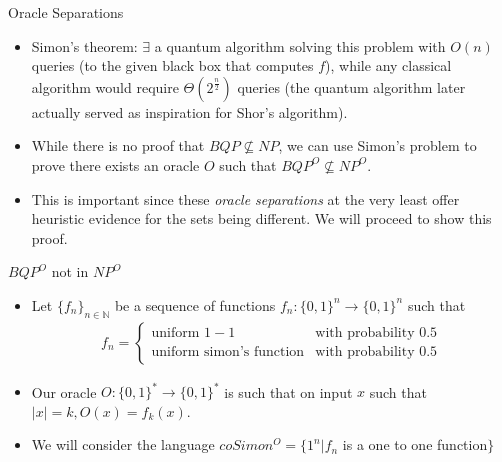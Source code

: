 \documentclass[aspectratio=169]{beamer}
\begin{document}
\begin{frame}{Oracle Separations}
  \begin{itemize}
    \item Simon's theorem: $\exists$ a quantum algorithm solving this problem with $O(n)$ queries (to the given black box that computes $f$), while any classical algorithm would require $\Theta(2^{\frac{n}{2}})$ queries (the quantum algorithm later actually served as inspiration for Shor's algorithm). \pause
    \item While there is no proof that $BQP \nsubseteq NP$, we can use Simon's problem to prove there exists an oracle $O$ such that $BQP^O \nsubseteq NP^O$. \pause
    \item This is important since these \emph{oracle separations} at the very least offer heuristic evidence for the sets being different. We will proceed to show this proof.
  \end{itemize}
\end{frame}

\begin{frame}{$BQP^O$ not in $NP^O$}
  \begin{itemize}
  \item Let $\{f_n\}_{n \in \mathbb{N}}$ be a sequence of functions $f_n: \{0, 1\}^n \rightarrow \{0, 1\}^n$ such that
        \begin{align*} f_n = 
            \begin{cases}
                \text{uniform } 1-1 &\text{with probability 0.5} \\
                \text{uniform simon's function} &\text{with probability 0.5}
            \end{cases}
        \end{align*} \pause
        \item Our oracle $O: \{0, 1\}^* \rightarrow \{0, 1\}^*$ is such that on input $x$ such that $|x| = k, O(x) = f_k(x)$. \pause
        \item We will consider the language $coSimon^O = \{1^n | f_n$ is a one to one function$\}$
  \end{itemize}
\end{frame}
\end{document}
